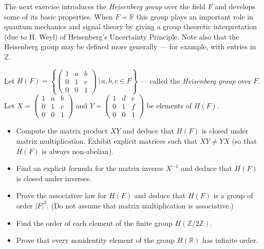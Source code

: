 \documentclass[12pt]{article}
\newenvironment{problem}[2][Exercise]{\begin{trivlist}
\item[\hskip \labelsep {\bfseries #1}\hskip \labelsep {\bfseries #2.}]}{\end{trivlist}}
\begin{document}
The next exercise introduces the \textit{Heisenberg group} over the field $F$ and develops some of its basic properties. When $F=\mathbb{R}$ this group plays an important role in quantum mechanics and signal theory by giving a group theoretic interpretation (due to H. Weyl) of Heisenberg's Uncertainty Principle. Note also that the Heisenberg group may be defined more generally --- for example, with entries in $\mathbb{Z}$. \\
\begin{problem}{1.4.11}
Let $H\left(F\right) = \left\{ \left(\begin{array}{ccc} 1 & a & b \\ 0 & 1 & c \\ 0 & 0 & 1 \end{array}\right) \, | \, a,b,c\in F\right\}$ --- called the \textit{Heisenberg group} over $F$. Let $X=\left(\begin{array}{ccc} 1 & a & b \\ 0 & 1 & c \\ 0 & 0 & 1 \end{array}\right)$ and $Y=\left(\begin{array}{ccc} 1 & d & e \\ 0 & 1 & f \\ 0 & 0 & 1 \end{array}\right)$ be elements of $H\left(F\right)$.
\begin{itemize}
    \item Compute the matrix product $XY$ and deduce that $H\left(F\right)$ is closed under matrix multiplication. Exhibit explicit matrices such that $XY\neq YX$ (so that $H\left(F\right)$ is always non-abelian).
    \item Find an explicit formula for the matrix inverse $X^{-1}$ and deduce that $H\left(F\right)$ is closed under inverses.
    \item Prove the associative law for $H\left(F\right)$ and deduce that $H\left(F\right)$ is a group of order $\left|F\right|^3$. (Do not assume that matrix multiplication is associative.)
    \item Find the order of each element of the finite group $H\left(\mathbb{Z}/2\mathbb{Z}\right)$.
    \item Prove that every nonidentity element of the group $H\left(\mathbb{R}\right)$ has infinite order.
\end{itemize}
\end{problem}
\end{document}
